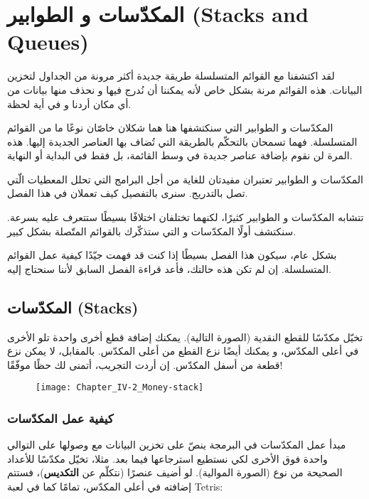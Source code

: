 \chapter{المكدّسات و الطوابير (\textenglish{Stacks and Queues})}

لقد اكتشفنا مع القوائم المتسلسلة طريقة جديدة أكثر مرونة من الجداول لتخزين البيانات. هذه القوائم مرنة بشكل خاص لأنه يمكننا أن نُدرج فيها و نحذف منها بيانات من أي مكان أردنا و في أية لحظة.

المكدّسات و الطوابير التي سنكتشفها هنا هما شكلان خاصّان نوعًا ما من القوائم المتسلسلة. فهما تسمحان بالتحكّم بالطريقة التي تُضاف بها العناصر الجديدة إليها. هذه المرة لن نقوم بإضافة عناصر جديدة في وسط القائمة، بل فقط في البداية أو النهاية. 

المكدّسات و الطوابير تعتبران مفيدتان للغاية من أجل البرامج التي تحلل المعطيات الّتي تصل بالتدريج. سنرى بالتفصيل كيف تعملان في هذا الفصل.

تتشابه المكدّسات و الطوابير كثيرًا، لكنهما تختلفان اختلافًا بسيطًا ستتعرف عليه بسرعة. سنكتشف أولًا المكدّسات و التي ستذكّرك بالقوائم المتّصلة بشكل كبير. 

بشكل عام، سيكون هذا الفصل بسيطًا إذا كنت قد فهمت جيّدًا كيفية عمل القوائم المتسلسلة. إن لم تكن هذه حالتك، فأعد قراءة الفصل السابق لأننا سنحتاج إليه.

\section{المكدّسات (\textenglish{Stacks})}

تخيّل مكدّسًا للقطع النقدية (الصورة التالية). يمكنك إضافة قطع أخرى واحدة تلو الأخرى في أعلى المكدّس، و يمكنك أيضًا نزع القطع من أعلى المكدّس. بالمقابل، لا يمكن نزع قطعة من أسفل المكدّس. إن أردت التجريب، أتمنى لك حظًا موفّقًا!

\begin{figure}[H]
	\centering
	\texttt{[image: Chapter\_IV-2\_Money-stack]}
\end{figure}

\subsection{كيفية عمل المكدّسات}

مبدأ عمل المكدّسات في البرمجة ينصّ على تخزين البيانات مع وصولها على التوالي واحدة فوق الأخرى لكي نستطيع استرجاعها فيما بعد. مثلا، تخيّل مكدّسًا للأعداد الصحيحة من نوع 
(الصورة الموالية). لو أضيف عنصرًا (نتكلّم عن
\textbf{التكديس})،
فستتم إضافته في أعلى المكدّس، تمامًا كما في لعبة 
\textenglish{Tetris}:

